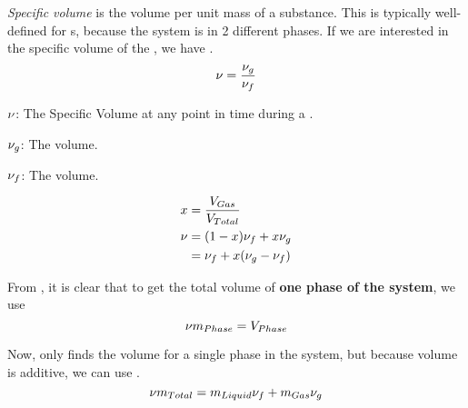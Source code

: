 \begin{definition}\label{def:Specific_Volume}
  \emph{Specific volume} is the volume per unit mass of a substance.
  This is typically well-defined for s, because the system is in 2 different phases.
  If we are interested in the specific volume of the , we have .
  \begin{equation}\label{eq:Specific_Volume}
    \nu = \frac{\nu_{g}}{\nu_{f}}
  \end{equation}

  \begin{description}[noitemsep]
  \item $\nu$: The Specific Volume at any point in time during a .
  \item $\nu_{g}$: The  volume.
  \item $\nu_{f}$: The  volume.
  \end{description}

  \begin{equation}\label{eq:Specific_Volume_Using_Quality}
    \begin{aligned}
      x &= \frac{V_{Gas}}{V_{Total}} \\
      \nu &= (1 - x) \nu_{f} + x \nu_{g} \\
      &= \nu_{f} + x (\nu_{g} - \nu_{f})
    \end{aligned}
  \end{equation}
\end{definition}

From , it is clear that to get the total volume of \textbf{one phase of the system}, we use 
\begin{equation}\label{eq:Single_Phase_Total_Volume}
  \nu m_{Phase} = V_{Phase}
\end{equation}

Now,  only finds the volume for a single phase in the system, but because volume is additive, we can use .
\begin{equation}\label{eq:Total_Volume}
  \nu m_{Total} = m_{Liquid} \nu_{f} + m_{Gas} \nu_{g}
\end{equation}

